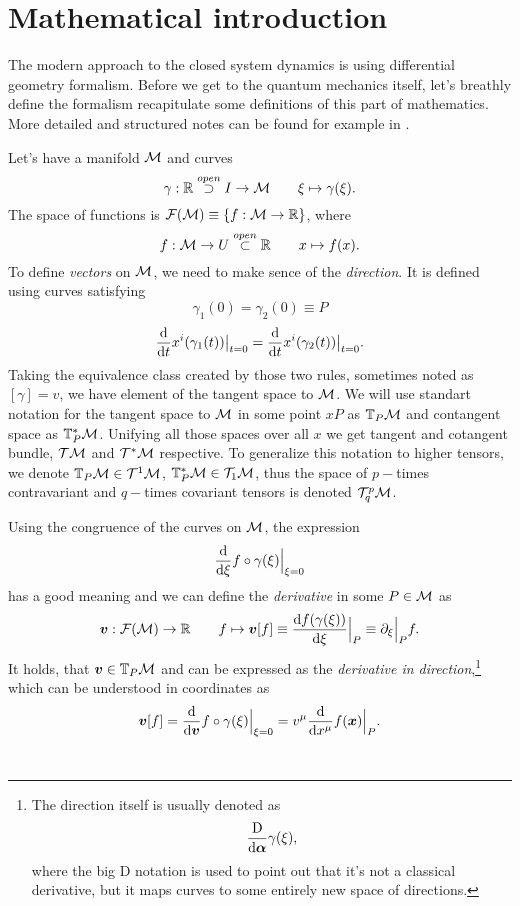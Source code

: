 \chapter{Mathematical introduction}
The modern approach to the closed system dynamics is using differential geometry formalism. Before we get to the quantum mechanics itself, let's breathly define the formalism recapitulate some definitions of this part of mathematics. More detailed and structured notes can be found for example in \citep{fecko}.

Let's have a manifold $\mathcal{M}$ and curves 
$$\gamma:\mathbb{R} \overset{open}{\supset} I \rightarrow \mathcal{M} \qquad \xi\mapsto \gamma(\xi).$$ 
The space of functions is $\mathcal{F}(\mathcal{M})\equiv\{f:\mathcal{M}\rightarrow \mathbb{R}\}$, where 
$$f:\mathcal{M}\rightarrow U\overset{open}{\subset} \mathbb{R} \qquad x\mapsto f(x).$$
To define \emph{vectors} on $\mathcal{M}$, we need to make sence of the \emph{direction}. It is defined using curves satisfying 
$$\gamma_1(0)=\gamma_2(0)\equiv P$$
$$\frac{\mathrm{d} }{\mathrm{d} t}x^i(\gamma_1(t))\big|_{t=0}=\frac{\mathrm{d} }{\mathrm{d} t}x^i(\gamma_2(t))\big|_{t=0}.$$
Taking the equivalence class created by those two rules, sometimes noted as $[\gamma]=v$, we have element of the tangent space to $\mathcal{M}$. We will use standart notation for the tangent space to $\mathcal{M}$ in some point $xP$ as $\mathbb{T}_P\mathcal{M}$ and contangent space as $\mathbb{T}^*_P\mathcal{M}$. Unifying all those spaces over all $x$ we get tangent and cotangent bundle, $\mathcal{T}\mathcal{M}$ and $\mathcal{T}^*\mathcal{M}$ respective. To generalize this notation to higher tensors, we denote $\mathbb{T}_P\mathcal{M}\in \mathcal{T}^1\mathcal{M}$, $\mathbb{T}^*_P\mathcal{M}\in \mathcal{T}_1\mathcal{M}$, thus the space of $p-$times contravariant and $q-$times covariant tensors is denoted $\mathcal{T}^p_q\mathcal{M}$.

Using the congruence of the curves on $\mathcal{M}$, the expression 
\begin{equation}
    \frac{\mathrm{d} }{\mathrm{d} \xi}f\circ \gamma(\xi)\Big|_{\xi=0}
\end{equation}
has a good meaning and we can define the \emph{derivative} in some $P\in\mathcal{M}$ as
\begin{equation}
    \bm v: \mathcal{F}(\mathcal{M})\rightarrow \mathbb{R} \qquad f\mapsto \bm v[f]\equiv \frac{\mathrm{d} f(\gamma(\xi))}{\mathrm{d} \xi}\Big|_P \equiv \partial_\xi\Big|_P f .
\end{equation}
It holds, that $\bm v\in \mathbb{T}_P\mathcal{M}$ and can be expressed as the \emph{derivative in direction},\footnote{
        The direction itself is usually denoted as
        \begin{equation}
            \frac{\mathrm{D}}{\mathrm{d}\bm\alpha}\gamma(\xi),
        \end{equation}
        where the big D notation is used to point out that it's not a classical derivative, but it maps curves to some entirely new space of directions.
    } 
which can be understood in coordinates as
\begin{equation}
    \bm v[f] = \frac{\mathrm{d} }{\mathrm{d} \bm v} f\circ \gamma(\xi)\Big|_{\xi=0}=v^\mu\frac{\mathrm{d} }{\mathrm{d} x^\mu} f(\bm x)\Big|_{P}.
\end{equation}\





